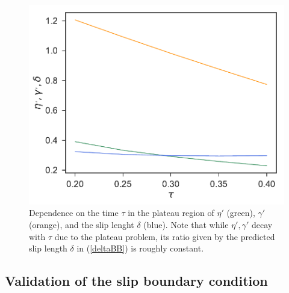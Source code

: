 \documentclass[b5paper,openright,10pt]{book}
\begin{document}
\begin{figure}[!h]
\centering
\includegraphics[scale=0.41]{tauDependenceSlip-17nodes-WALLS}
\caption[Dependence on time $\tau$ in the plateau region of $\eta'$,$\gamma'$ and the slip lenght $\delta$]{Dependence  on  the time  $\tau$  in  the plateau  region  of
  $\eta'$  (green),  $\gamma'$  (orange),  and the  slip  lenght  $\delta$
  (blue). Note  that while $\eta',\gamma'$  decay with $\tau$  due to
  the plateau  problem, its ratio  given by the predicted  slip length
  $\delta$ in (\ref{deltaBB}) is roughly constant. }
\label{Fig:tau}
\end{figure}


\subsection{Validation of the slip boundary condition}
\label{Sub:Val}
\end{document}
